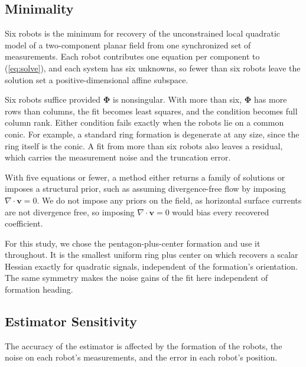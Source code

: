 \documentclass[lettersize,journal]{IEEEtran}
\begin{document}
\subsection{Minimality}
\label{sec:minimality}

Six robots is the minimum for recovery of the unconstrained local
quadratic model of a two-component planar field from one synchronized set of measurements. Each robot contributes one equation per component to
(\ref{eq:solve}), and each system has six unknowns, so fewer than six
robots leave the solution set a positive-dimensional affine subspace.

Six robots suffice provided $\boldsymbol{\Phi}$ is nonsingular. With
more than six, $\boldsymbol{\Phi}$ has more rows than columns, the fit
becomes least squares, and the condition becomes full column rank.
Either condition fails exactly when the robots lie on a common conic.
For example, a standard ring formation is degenerate at any size, since
the ring itself is the conic. A fit from more than six robots also
leaves a residual, which carries the measurement noise and the
truncation error.

With five equations or fewer, a method either returns a family of solutions or imposes a structural prior, such as assuming
divergence-free flow by imposing $\nabla\cdot\mathbf{v} = 0$. We do not impose any priors on the field, as horizontal surface
currents are not divergence free, so imposing
$\nabla\cdot\mathbf{v} = 0$ would bias every recovered coefficient.

For this study, we chose the pentagon-plus-center formation and use it
throughout. It is the smallest uniform ring plus center on which \cite{5}
recovers a scalar Hessian exactly for quadratic signals, independent of
the formation's orientation. The same symmetry makes the noise gains of
the fit here independent of formation heading.


\subsection{Estimator Sensitivity}
\label{sec:sensitivity}

The accuracy of the estimator is affected by the formation of the
robots, the noise on each robot's measurements, and the error in each
robot's position.
\end{document}
